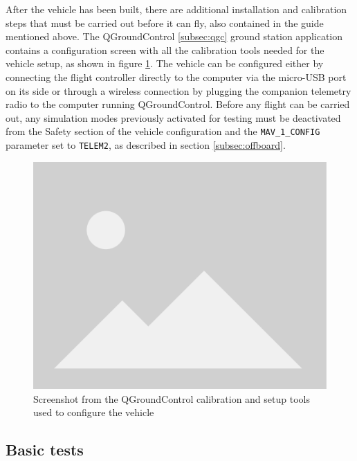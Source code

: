 After the vehicle has been built, there are additional installation and calibration steps that must be carried out before it can fly, also contained in the guide mentioned above.
The QGroundControl \ref{subsec:qgc} ground station application contains a configuration screen with all the calibration tools needed for the vehicle setup, as shown in figure \ref{fig:qgc-config}.
The vehicle can be configured either by connecting the flight controller directly to the computer via the micro-USB port on its side or through a wireless connection by plugging the companion telemetry radio to the computer running QGroundControl.
Before any flight can be carried out, any simulation modes previously activated for testing must be deactivated from the Safety section of the vehicle configuration and the \texttt{MAV\_1\_CONFIG} parameter set to \texttt{TELEM2}, as described in section \ref{subsec:offboard}.


\begin{figure}
  \centering
  \includegraphics[width=\textwidth, keepaspectratio]{img/placeholder.png}
  \caption{Screenshot from the QGroundControl calibration and setup tools used to configure the vehicle}\label{fig:qgc-config}
\end{figure}


\subsection{Basic tests}
\label{sec:test-8-flight}



